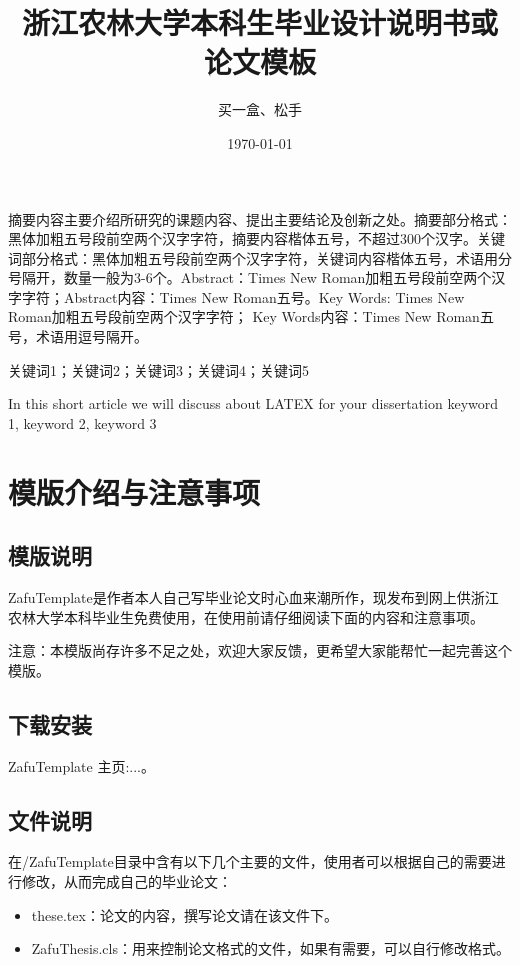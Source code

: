 \documentclass[AutoFakeBold]{ZafuThesis}
\author{买一盒、松手}%
\date{\today}%
\title{{浙江农林大学本科生}{毕业设计说明书或论文模板}}%
\begin{document}
\customCover

\makestatement

\customContent

\frontmatter
\ZhAbstract
{
  摘要内容主要介绍所研究的课题内容、提出主要结论及创新之处。摘要部分格式：黑体加粗五号段前空两个汉字字符，摘要内容楷体五号，不超过300个汉字。关键词部分格式：黑体加粗五号段前空两个汉字字符，关键词内容楷体五号，术语用分号隔开，数量一般为3-6个。Abstract：Times New Roman加粗五号段前空两个汉字字符；Abstract内容：Times New Roman五号。Key Words: Times New Roman加粗五号段前空两个汉字字符； Key Words内容：Times New Roman五号，术语用逗号隔开。
  
}
{关键词1；关键词2；关键词3；关键词4；关键词5}


\EnAbstract
{In this short article we will discuss about LATEX for your dissertation}
{keyword 1, keyword 2, keyword 3}



\mainmatter
\section{模版介绍与注意事项}
\subsection{模版说明}
ZafuTemplate是作者本人自己写毕业论文时心血来潮所作，现发布到网上供浙江农林大学本科毕业生免费使用，在使用前请仔细阅读下面的内容和注意事项。\par
注意：本模版尚存许多不足之处，欢迎大家反馈，更希望大家能帮忙一起完善这个模版。
\subsection{下载安装}
ZafuTemplate 主页:...。
\subsection{文件说明}
在/ZafuTemplate目录中含有以下几个主要的文件，使用者可以根据自己的需要进行修改，从而完成自己的毕业论文：
\begin{itemize}
  \item these.tex：论文的内容，撰写论文请在该文件下。
  \item ZafuThesis.cls：用来控制论文格式的文件，如果有需要，可以自行修改格式。
\end{itemize}
\end{document}

